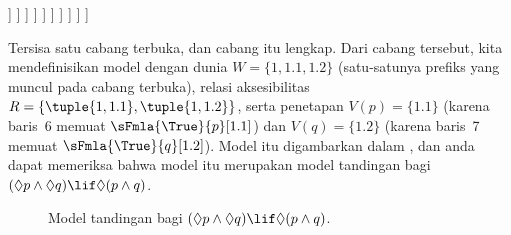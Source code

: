 \documentclass[../../../include/open-logic-section]{subfiles}
\begin{document}
{\begin{ex}
\begin{oltableau}
                      ]
                    ]
                  ]
                ]
              ]
            ]
          ]
        ]
      ]
    ]
  \end{oltableau}
  Tersisa satu cabang terbuka, dan cabang itu lengkap. Dari cabang tersebut,
  kita mendefinisikan model dengan dunia $W = \{1, 1.1, 1.2\}$ (satu-satunya
  prefiks yang muncul pada cabang terbuka), relasi aksesibilitas
  $R = \{\tuple{1, 1.1}, \tuple{1, 1.2}\}$, serta penetapan
  $V(p) = \{1.1\}$ (karena baris~6 memuat
  $\sFmla{\True}{p}[1.1]$) dan $V(q) = \{1.2\}$ (karena baris~7 memuat
  $\sFmla{\True}{q}[1.2]$). Model itu digambarkan dalam
  , dan anda dapat memeriksa bahwa model itu
  merupakan model tandingan bagi
  $(\Diamond p \land \Diamond q) \lif \Diamond (p \land q)$.
  \begin{figure}
  \begin{center}
  \end{center}
  \caption{Model tandingan bagi $(\Diamond p \land \Diamond q) \lif
    \Diamond (p \land q)$.}
\end{figure}
\end{ex}          
}
\end{document}
